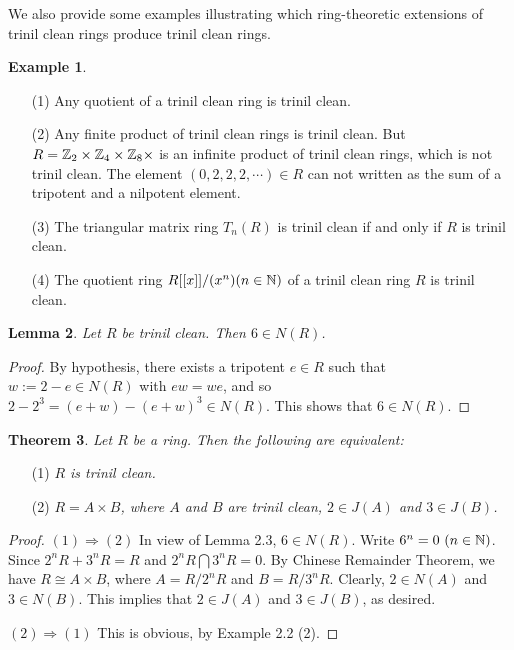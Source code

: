 \documentclass[12pt, reqno]{amsart}
\newtheorem{thm}{Theorem}[section]
\newtheorem{lem}[thm]{Lemma}
\newtheorem{exam}[thm]{Example}
\numberwithin{equation}{section}
\begin{document}
We also provide some examples illustrating which ring-theoretic extensions of trinil clean rings produce trinil clean rings.

\begin{exam} \end{exam}
\begin{enumerate}
\item [(1)] Any quotient of a trinil clean ring is trinil clean.
\item [(2)] Any finite product of trinil clean rings is trinil clean. But $R={\Bbb Z}_2\times {\Bbb Z}_4\times {\Bbb Z}_8\times $ is an infinite product of trinil clean rings, which is not trinil clean. The element $(0,2,2,2,\cdots )\in R$ can not written as the sum of a tripotent and a nilpotent element.
\item [(3)] The triangular matrix ring $T_n(R)$ is trinil clean if and only if $R$ is trinil clean.
\item [(4)] The quotient ring $R[[x]]/(x^n) (n\in {\Bbb N})$ of a trinil clean ring $R$ is trinil clean.
\end{enumerate}

\begin{lem} Let $R$ be trinil clean. Then $6\in N(R)$.\end{lem}
\begin{proof} By hypothesis, there exists a tripotent $e\in R$ such that $w:=2-e\in N(R)$ with $ew=we$, and so
$2-2^3=(e+w)-(e+w)^3\in N(R)$. This shows that $6\in N(R)$.\end{proof}

\begin{thm} Let
$R$ be a ring. Then the following are equivalent:
\end{thm}
\begin{enumerate}
\item [(1)]{\it $R$ is trinil clean.}
\vspace{-.5mm}
\item [(2)]{\it $R=A\times B$, where $A$ and $B$ are trinil clean, $2\in J(A)$ and $3\in J(B)$.}
\end{enumerate}
\begin{proof} $(1)\Rightarrow (2)$ In view of Lemma 2.3, $6\in N(R)$.
Write $6^n=0~(n\in {\Bbb N})$. Since $2^nR+3^nR=R$ and $2^nR\bigcap 3^nR=0$. By Chinese Remainder Theorem, we have
$R\cong A\times B$, where $A=R/2^nR$ and $B=R/3^nR$. Clearly, $2\in N(A)$ and $3\in N(B)$. This implies that
$2\in J(A)$ and $3\in J(B)$, as desired.

$(2)\Rightarrow (1)$ This is obvious, by Example 2.2 (2).\end{proof}
\end{document}
